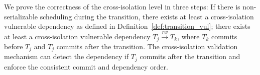 We prove the correctness of the cross-isolation level in three steps: If there is non-serializable scheduling during the transition,  there exists at least a cross-isolation vulnerable dependency as defined in Definition~\ref{def:transition_vul}; 
 there exists at least a cross-isolation vulnerable dependency $T_j \xrightarrow{rw} T_k$, where $T_k$ commits before $T_j$ and $T_j$ commits after the transition. 
 The cross-isolation validation mechanism can detect the dependency if $T_j$ commits after the transition and enforce the consistent commit and dependency order. 


